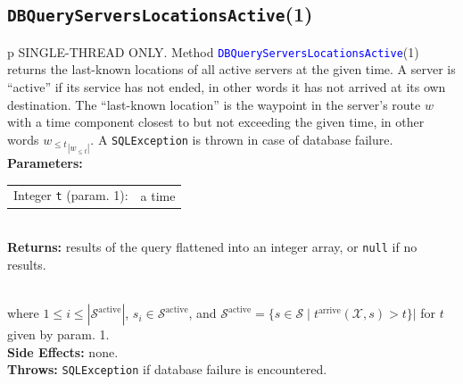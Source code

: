 \subsection{\texttt{DBQueryServersLocationsActive}(1)}
\begin{tabular}{p{\textwidth}}
\toprule
{}
SINGLE-THREAD ONLY. Method \textcolor{blue}{{\tt{}\protect{}DBQueryServersLocationsActive}}(1) returns the
last-known locations of all active servers at the given time. A server is
``active'' if its service has not ended, in other words it has not arrived
at its own destination.
The ``last-known location'' is the waypoint in the server's route $w$
with a time component closest to but not exceeding the given time, in other
words ${w_{\leq t}}_{|w_{\leq t}|}$.
A {\tt{}SQLException} is thrown in case of database failure.\\
\midrule
\textbf{Parameters:} \\
\begin{tabular}{lp{116mm}}
Integer {\tt{}t} (param. 1):&a time
\end{tabular}\\
\textbf{Returns:} results of the query flattened into an integer array, or
{\tt{}null} if no results.

\\

where $1\leq i\leq |\mathcal{S}^\textrm{active}|$,
$s_i\in \mathcal{S}^\textrm{active}$, and
$\mathcal{S}^\textrm{active}= \{s\in\mathcal{S}\mid t^\textrm{arrive}(\mathcal{X},s)>t\}|$
for $t$ given by param. 1.\\
\textbf{Side Effects:} none.\\
\textbf{Throws:} {\tt{}SQLException} if database failure is encountered.\\
\bottomrule
\end{tabular}
\nwenddocs{}\endmoddef{}

